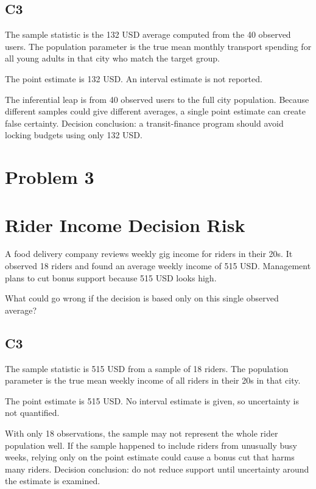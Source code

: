 \begin{ExamProblems}
		\subsection*{C3}
		The sample statistic is the 132 USD average computed from the 40 observed users.
		The population parameter is the true mean monthly transport spending for all young adults in that city who match the target group.

		The point estimate is 132 USD.
		An interval estimate is not reported.

		The inferential leap is from 40 observed users to the full city population.
		Because different samples could give different averages, a single point estimate can create false certainty.
		Decision conclusion: a transit-finance program should avoid locking budgets using only 132 USD.

		\newpage
		\item
		\section{Problem 3}
		\section{Rider Income Decision Risk}
		A food delivery company reviews weekly gig income for riders in their 20s.
		It observed 18 riders and found an average weekly income of 515 USD.
		Management plans to cut bonus support because 515 USD looks high.

		What could go wrong if the decision is based only on this single observed average?

		\subsection*{C3}
		The sample statistic is 515 USD from a sample of 18 riders.
		The population parameter is the true mean weekly income of all riders in their 20s in that city.

		The point estimate is 515 USD.
		No interval estimate is given, so uncertainty is not quantified.

		With only 18 observations, the sample may not represent the whole rider population well.
		If the sample happened to include riders from unusually busy weeks, relying only on the point estimate could cause a bonus cut that harms many riders.
		Decision conclusion: do not reduce support until uncertainty around the estimate is examined.


\end{ExamProblems}
